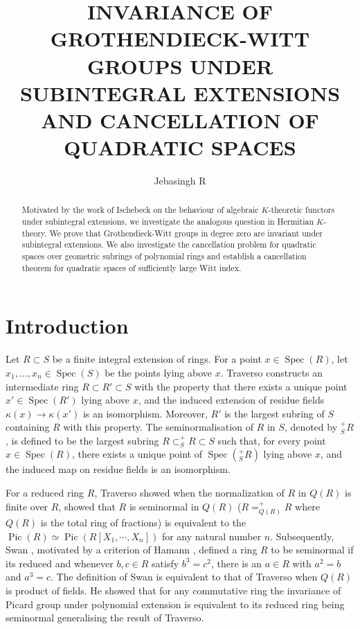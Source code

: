 \documentclass[11pt,a4paper]{amsart}
\title[GW groups and cancellation of quadratic spaces]{INVARIANCE OF GROTHENDIECK-WITT GROUPS UNDER
SUBINTEGRAL EXTENSIONS AND CANCELLATION OF QUADRATIC SPACES}
\author{Jebasingh R}
\date{}
\theoremstyle{plain}
\theoremstyle{definition}
\theoremstyle{remark}
\begin{document}
\maketitle
\begin{abstract}
    Motivated by the work of Ischebeck on the behaviour of algebraic $K$-theoretic functors under subintegral extensions, we investigate the analogous question in Hermitian $K$-theory. We prove that Grothendieck-Witt groups in degree zero are invariant under  subintegral extensions. We also investigate the cancellation problem for quadratic spaces over geometric subrings of polynomial rings and establish a cancellation theorem for quadratic spaces of sufficiently large Witt index.
\end{abstract}
\section{Introduction}
Let $R \subset S$ be a finite integral extension of rings. For a point $x \in \operatorname{Spec}(R)$, let
$x_1,\ldots,x_n \in \operatorname{Spec}(S)$
be the points lying above $x$. Traverso \cite[p. 588]{traverso1970seminormality} constructs an intermediate ring
$R \subset R' \subset S$
with the property that there exists a unique point $x' \in \operatorname{Spec}(R')$ lying above $x$, and the induced extension of residue fields $\kappa(x)\rightarrow \kappa(x')$
is an isomorphism. Moreover, $R'$ is the largest subring of $S$ containing $R$ with this property.
The seminormalisation of $R$ in $S$, denoted by $^{+}_{S}R$, is defined to be the largest subring
$R \subset  ^+_SR \subset S$
such that, for every point $x \in \operatorname{Spec}(R)$, there exists a unique point of $\operatorname{Spec}(^{+}_{S}R)$ lying above $x$, and the induced map on residue fields is an isomorphism.

For a reduced ring $R$, Traverso showed when the normalization of $R$ in $Q(R)$ is finite over $R$, showed that $R$ is seminormal in $Q(R)$ ($R=^+_{Q(R)}R$ where $Q(R)$ is the total ring of fractions) is equivalent to the $\operatorname{Pic}(R)\simeq \operatorname{Pic}(R[X_1,\cdots, X_n])$ for any natural number $n$.
Subsequently, Swan \cite{swan1980seminormality}, motivated by a criterion of Hamann \cite[Proposition 2.10]{hamann1975r}, defined a ring $R$ to be seminormal if its reduced and whenever $b,c\in R$ satisfy $b^3=c^2$, there is an $a\in R$ with $a^2=b$ and $a^3=c$. The definition of Swan is equivalent to that of Traverso when $Q(R)$ is product of fields. He showed that for any commutative ring the invariance of Picard group under polynomial extension is equivalent to its reduced ring being seminormal generalising the result of Traverso. 
\end{document}
